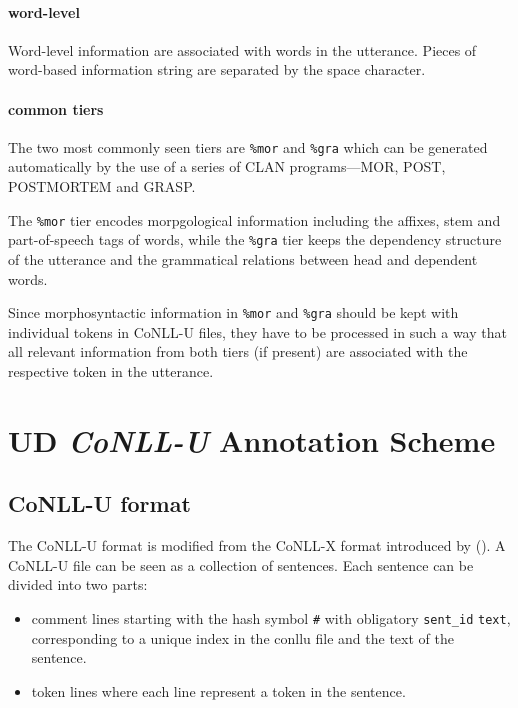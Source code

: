 \paragraph{word-level}
Word-level information are associated with words in the utterance. Pieces of word-based information string are separated by the space character.

\paragraph{common tiers}
The two most commonly seen tiers are \texttt{\%mor} and \texttt{\%gra} which can be generated automatically by the use of a series of CLAN programs---MOR, POST, POSTMORTEM and GRASP.

The \texttt{\%mor} tier encodes morpgological information including the affixes, stem and part-of-speech tags of words, while the \texttt{\%gra} tier keeps the dependency structure of the utterance and the grammatical relations between head and dependent words.

Since morphosyntactic information in \texttt{\%mor} and \texttt{\%gra} should be kept with individual tokens in CoNLL-U files, they have to be processed in such a way that all relevant information from both tiers (if present) are associated with the respective token in the utterance.



\section{UD \emph{CoNLL-U} Annotation Scheme}

\subsection{CoNLL-U format}
The CoNLL-U format is modified from the CoNLL-X format introduced by (\cite{buchholz-marsi-2006-conll}). A CoNLL-U file can be seen as a collection of sentences. Each sentence can be divided into two parts:
\begin{itemize}
	\item comment lines starting with the hash symbol \texttt{\#} with obligatory \texttt{sent\_id} \texttt{text}, corresponding to a unique index in the conllu file and the text of the sentence.
	\item token lines where each line represent a token in the sentence.
\end{itemize}

